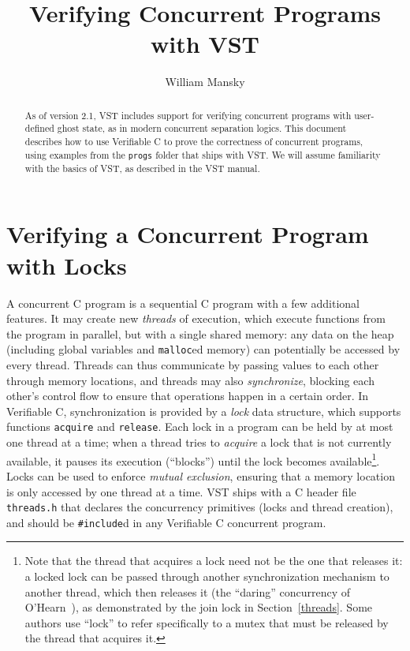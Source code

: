 \documentclass[11pt]{article}
\title{Verifying Concurrent Programs with VST}
\author{William Mansky}
\begin{document}
\maketitle

\begin{abstract}
As of version 2.1, VST includes support for verifying concurrent programs with user-defined ghost state, as in modern concurrent separation logics. This document describes how to use Verifiable C to prove the correctness of concurrent programs, using examples from the \texttt{progs} folder that ships with VST. We will assume familiarity with the basics of VST, as described in the VST manual.
\end{abstract}

\section{Verifying a Concurrent Program with Locks}
A concurrent C program is a sequential C program with a few additional features. It may create new \emph{threads} of execution, which execute functions from the program in parallel, but with a single shared memory: any data on the heap (including global variables and \texttt{malloc}ed memory) can potentially be accessed by every thread. Threads can thus communicate by passing values to each other through memory locations, and threads may also \emph{synchronize}, blocking each other's control flow to ensure that operations happen in a certain order. In Verifiable C, synchronization is provided by a \emph{lock} data structure, which supports functions \texttt{acquire} and \texttt{release}. Each lock in a program can be held by at most one thread at a time; when a thread tries to \emph{acquire} a lock that is not currently available, it pauses its execution (``blocks'') until the lock becomes available\footnote{Note that the thread that acquires a lock need not be the one that releases it: a locked lock can be passed through another synchronization mechanism to another thread, which then releases it (the ``daring'' concurrency of O'Hearn~\cite{csl}), as demonstrated by the join lock in Section~\ref{threads}. Some authors use ``lock'' to refer specifically to a mutex that must be released by the thread that acquires it.}. Locks can be used to enforce \emph{mutual exclusion}, ensuring that a memory location is only accessed by one thread at a time. VST ships with a C header file \texttt{threads.h} that declares the concurrency primitives (locks and thread creation), and should be \texttt{\#include}d in any Verifiable C concurrent program.
\end{document}

